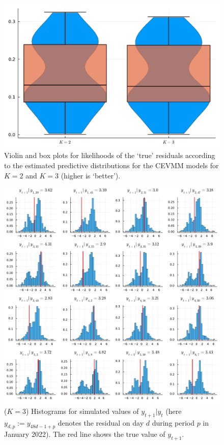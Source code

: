 \documentclass[11pt,twoside,openany]{book}
\numberwithin{Theorem}{chapter}
\numberwithin{Definition}{chapter}
\numberwithin{Lemma}{chapter}
\numberwithin{Algorithm}{chapter}
\numberwithin{equation}{chapter}
\begin{document}
\begin{figure}[htp]
  \centering
  \includegraphics[scale=0.70]{../elexon/figures/2vs3_violin.pdf}
  \caption{Violin and box plots for likelihoods of the `true' residuals according to
  the estimated predictive distributions for the CEVMM models for $K=2$ and $K=3$ (higher is `better').}\label{fig:k2_k3_violin}
\end{figure}


\begin{figure}[htp]
  \centering
  \includegraphics[scale=0.5]{../elexon/figures/ytp1_giv_yt_jan_22_Keq3.pdf}
  \caption{($K=3$) Histograms for simulated values of $y_{t+1}|y_{t}$ (here $y_{d,p}:=y_{48d - 1 + p}$ denotes the residual on day $d$ during period $p$ in January
    2022).
The red line shows the true value of $y_{t+1}$.}\label{fig:jan22_hists_k3}
\end{figure}
\end{document}
